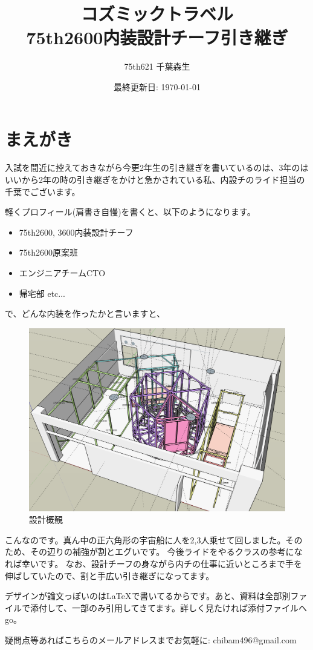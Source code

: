 \documentclass{jsarticle}
\title{
    コズミックトラベル \\
    \large 75th2600内装設計チーフ引き継ぎ
}
\author{75th621 千葉森生}
\date{最終更新日: \today}
\begin{document}
\maketitle

\section{まえがき}

入試を間近に控えておきながら今更2年生の引き継ぎを書いているのは、3年のはいいから2年の時の引き継ぎをかけと急かされている私、内設チのライド担当の千葉でございます。

軽くプロフィール(肩書き自慢)を書くと、以下のようになります。
\begin{itemize}
    \item 75th2600, 3600内装設計チーフ
    \item 75th2600原案班
    \item エンジニアチームCTO
    \item 帰宅部 etc...
\end{itemize}

で、どんな内装を作ったかと言いますと、

\begin{figure}[htbp]
    \centering
    \includegraphics[width=0.5\linewidth]{images/plan_overview/1.png}
    \caption{設計概観}
    \label{fig:設計概観}
\end{figure}

こんなのです。真ん中の正六角形の宇宙船に人を2,3人乗せて回しました。そのため、その辺りの補強が割とエグいです。
今後ライドをやるクラスの参考になれば幸いです。
なお、設計チーフの身ながら内チの仕事に近いところまで手を伸ばしていたので、割と手広い引き継ぎになってます。

デザインが論文っぽいのは\LaTeX{}で書いてるからです。あと、資料は全部別ファイルで添付して、一部のみ引用してきてます。詳しく見たければ添付ファイルへgo。

疑問点等あればこちらのメールアドレスまでお気軽に:  chibam496@gmail.com

\clearpage
\end{document}
